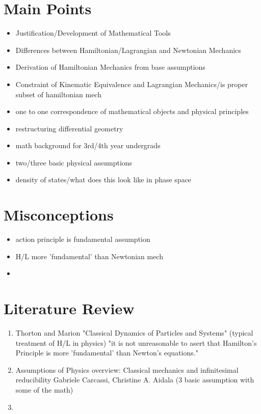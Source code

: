 \documentclass{article}
\begin{document}
\section{Main Points}
\begin{itemize}

\item Justification/Development of Mathematical Tools
\item Differences between Hamiltonian/Lagrangian and Newtonian Mechanics
\item Derivation of Hamiltonian Mechanics from base assumptions
\item Constraint of Kinematic Equivalence and Lagrangian Mechanics/is proper subset of hamiltonian mech
\item one to one correspondence of mathematical objects and physical principles
\item restructuring differential geometry
\item math background for 3rd/4th year undergrads
\item two/three basic physical assumptions
\item density of states/what does this look like in phase space
\end{itemize}


\section{Misconceptions}
\begin{itemize}
\item action principle is fundamental assumption 
\item H/L more 'fundamental' than Newtonian mech
\item 
\end{itemize}

\section{Literature Review}
\begin{enumerate}
\item Thorton and Marion "Classical Dynamics of Particles and Systems"
(typical treatment of H/L in physics)
"it is not unreasonable to asert that Hamilton's Principle is more 'fundamental' than Newton's equations."
\item Assumptions of Physics overview:
Classical mechanics and infinitesimal reducibility
Gabriele Carcassi, Christine A. Aidala (3 basic assumption with some of the math)
\item 
\end{enumerate}
\end{document}
